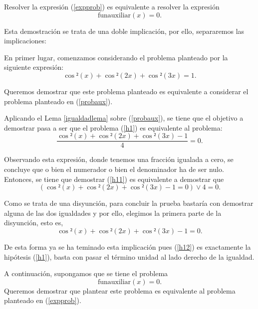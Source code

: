 \begin{lema}[Equivalencia]
  Resolver la expresión (\ref{expprob}) es equivalente a resolver
  la expresión
  \begin{equation}\label{probaux}
    \text{funauxiliar}(x)=0.
  \end{equation}
\end{lema}
\begin{demostracion}
  Esta demostración se trata de una doble implicación, por ello,
  separaremos las implicaciones:

  \noindent
  \framebox{\longrightarrow}
  En primer lugar, comenzamos considerando el problema planteado
  por la siguiente expresión:
  \begin{equation}\label{h1}\tag{h1}
    \cos²(x)+\cos²(2x)+\cos²(3x)=1.
  \end{equation}

  Queremos demostrar que este problema planteado es equivalente a
  considerar el problema planteado en (\ref{probaux}).

  Aplicando el Lema \ref{igualdadlema} sobre (\ref{probaux}), se
  tiene que el objetivo a demostrar pasa a ser que el problema
  (\ref{h1}) es equivalente al problema:
  \begin{equation}\label{h11}
    \frac{\cos²(x)+\cos²(2x)+\cos²(3x)-1}{4}=0.
  \end{equation}

  Observando esta expresión, donde tenemos una fracción igualada
  a cero, se concluye que o bien el numerador o bien el denominador
  ha de ser nulo. Entonces, se tiene que demostrar (\ref{h11}) es
  equivalente a demostrar que
  \begin{equation}
    (\cos²(x)+\cos²(2x)+\cos²(3x)-1=0) \lor 4=0.
  \end{equation}

  Como se trata de una disyunción, para concluir la prueba bastaría
  con demostrar alguna de las dos igualdades y por ello, elegimos
  la primera parte de la disyunción, esto es,
  \begin{equation}\label{h12}
    \cos²(x)+\cos²(2x)+\cos²(3x)-1=0.
  \end{equation}

  De esta forma ya se ha teminado esta implicación pues (\ref{h12})
  es exactamente la hipótesis (\ref{h1}), basta con pasar el término
  unidad al lado derecho de la igualdad.


  \noindent
  \framebox{\longleftarrow} A continuación, supongamos que se tiene
  el problema
  \begin{equation}\label{h2}\tag{h2}
    \text{funauxiliar}(x)=0.
  \end{equation}
  Queremos demostrar que plantear este problema es equivalente al
  problema planteado en (\ref{expprob}).


\end{demostracion}
